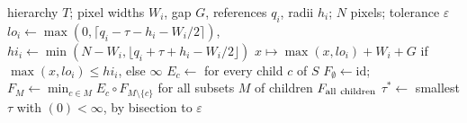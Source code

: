 \begin{algorithm}[H]
\caption{Certificate $\tau^*$ at display resolution (Theorem~\ref{thm:dp}).}\label{alg:cert}
\begin{algorithmic}[1]
\Require hierarchy $T$; pixel widths $W_i$, gap $G$, references $q_i$, radii $h_i$; $N$ pixels; tolerance $\varepsilon$
 
    \State $lo_i\gets\max(0,\lceil q_i-\tau-h_i-W_i/2\rceil)$, $hi_i\gets\min(N-W_i,\lfloor q_i+\tau+h_i-W_i/2\rfloor)$
    \State \Return $x\mapsto\max(x,lo_i)+W_i+G$ if $\max(x,lo_i)\le hi_i$, else $\infty$
  \EndIf
  \State $E_c\gets$  for every child $c$ of $S$
  \State $F_\emptyset\gets\mathrm{id}$;\ \ $F_M\gets\min_{c\in M}E_c\circ F_{M\setminus\{c\}}$ for all subsets $M$ of children
  \State \Return $F_{\rm all\ children}$ 
\EndFunction
\State $\tau^*\gets$ smallest $\tau$ with $(0)<\infty$, by bisection to $\varepsilon$
\end{algorithmic}
\end{algorithm}
